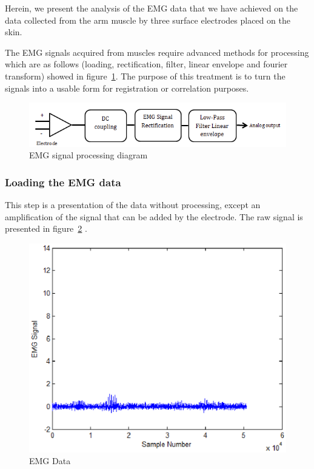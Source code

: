 \documentclass[conference]{IEEEtran}
\begin{document}
Herein, we present the analysis of the EMG data that we have achieved on the data collected from the arm muscle by three surface electrodes placed on the skin.\par
The EMG signals acquired from muscles require advanced methods for processing which are as follows (loading, rectification, filter, linear envelope and fourier transform) showed in figure~\ref{fig:struct}. The purpose of this treatment is to turn the signals into a usable form  for registration or correlation purposes.\par

\begin{figure}[!hb]
    \includegraphics[scale=0.45]{Figures/fig0.png}
    \caption{EMG signal processing diagram}
    \label{fig:struct}
\end{figure}


\subsubsection{Loading the EMG data} \label{sub:LoadingtheEMGdata}\par
This step is a presentation of the data without processing, except an amplification of the signal that can be added by the electrode. The raw signal is presented in figure~\ref{fig:data} .\par

\begin{figure}[!hb]
    \hspace*{1.2 cm}
    \includegraphics[scale=0.40]{Figures/fig1.eps}
    \caption{EMG Data}
    \label{fig:data}
\end{figure}
\end{document}
